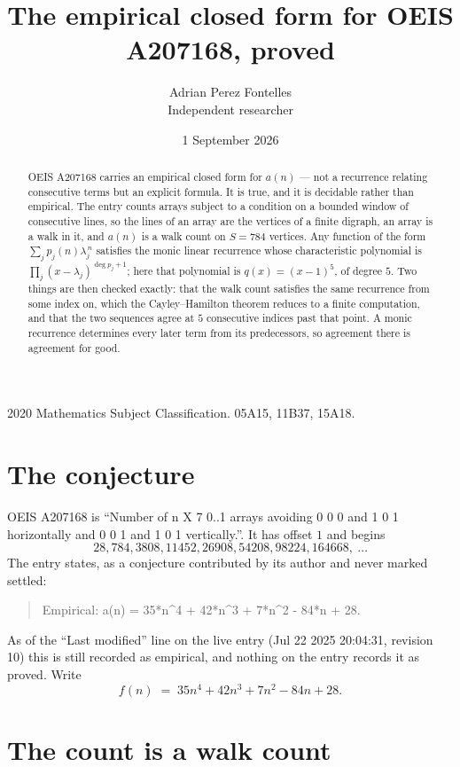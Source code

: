 \documentclass[11pt,a4paper]{article}
\title{The empirical closed form for OEIS A207168, proved}
\author{Adrian Perez Fontelles\\ \small Independent researcher}
\date{1 September 2026}
\theoremstyle{plain}
\theoremstyle{definition}
\begin{document}
\maketitle

\begin{abstract}
OEIS A207168 carries an empirical closed form for $a(n)$ --- not a recurrence relating
consecutive terms but an explicit formula. It is true, and it is decidable rather than
empirical. The entry counts arrays subject to a condition on a bounded window of consecutive lines, so the lines of an array are the
vertices of a finite digraph, an array is a walk in it, and $a(n)$ is a walk count on
$S=784$ vertices. Any function of the form $\sum_j p_j(n)\lambda_j^{\,n}$ satisfies the
monic linear recurrence whose characteristic polynomial is
$\prod_j(x-\lambda_j)^{\deg p_j+1}$; here that polynomial is $q(x)=(x-1)^{5}$, of degree
$5$. Two things are then checked exactly: that the walk count satisfies the same
recurrence from some index on, which the Cayley--Hamilton theorem reduces to a finite
computation, and that the two sequences agree at $5$ consecutive indices past that
point. A monic recurrence determines every later term from its predecessors, so agreement
there is agreement for good.
\end{abstract}

\noindent\small 2020 Mathematics Subject Classification. 05A15, 11B37, 15A18.\normalsize

\section{The conjecture}

OEIS A207168 is ``Number of n X 7 0..1 arrays avoiding 0 0 0 and 1 0 1 horizontally and 0 0 1 and 1 0 1 vertically.''. It has offset $1$ and begins
\[
28, 784, 3808, 11452, 26908, 54208, 98224, 164668,\ \dots
\]
The entry states, as a conjecture contributed by its author and never marked settled:
\begin{quote}
Empirical: a(n) = 35*n\^{}4 + 42*n\^{}3 + 7*n\^{}2 - 84*n + 28.
\end{quote}
As of the ``Last modified'' line on the live entry (Jul 22 2025 20:04:31, revision 10) this is still
recorded as empirical, and nothing on the entry records it as proved. Write
\[
f(n)\;=\;35 n^{4} + 42 n^{3} + 7 n^{2} - 84 n + 28.
\]

\section{The count is a walk count}
\end{document}
